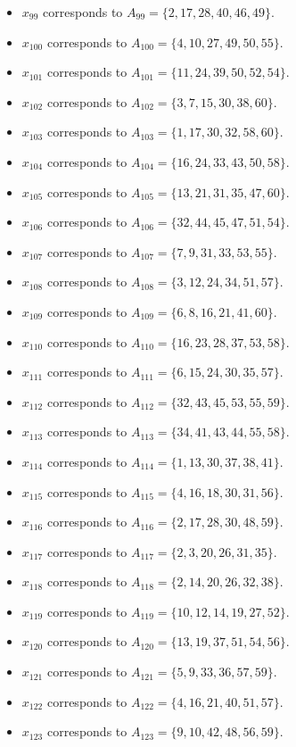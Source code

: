 \documentclass[11pt]{article}
\begin{document}
\begin{itemize}
\item $x_{99}$ corresponds to $A_{99}=\{2, 17, 28, 40, 46, 49\}$.
\item $x_{100}$ corresponds to $A_{100}=\{4, 10, 27, 49, 50, 55\}$.
\item $x_{101}$ corresponds to $A_{101}=\{11, 24, 39, 50, 52, 54\}$.
\item $x_{102}$ corresponds to $A_{102}=\{3, 7, 15, 30, 38, 60\}$.
\item $x_{103}$ corresponds to $A_{103}=\{1, 17, 30, 32, 58, 60\}$.
\item $x_{104}$ corresponds to $A_{104}=\{16, 24, 33, 43, 50, 58\}$.
\item $x_{105}$ corresponds to $A_{105}=\{13, 21, 31, 35, 47, 60\}$.
\item $x_{106}$ corresponds to $A_{106}=\{32, 44, 45, 47, 51, 54\}$.
\item $x_{107}$ corresponds to $A_{107}=\{7, 9, 31, 33, 53, 55\}$.
\item $x_{108}$ corresponds to $A_{108}=\{3, 12, 24, 34, 51, 57\}$.
\item $x_{109}$ corresponds to $A_{109}=\{6, 8, 16, 21, 41, 60\}$.
\item $x_{110}$ corresponds to $A_{110}=\{16, 23, 28, 37, 53, 58\}$.
\item $x_{111}$ corresponds to $A_{111}=\{6, 15, 24, 30, 35, 57\}$.
\item $x_{112}$ corresponds to $A_{112}=\{32, 43, 45, 53, 55, 59\}$.
\item $x_{113}$ corresponds to $A_{113}=\{34, 41, 43, 44, 55, 58\}$.
\item $x_{114}$ corresponds to $A_{114}=\{1, 13, 30, 37, 38, 41\}$.
\item $x_{115}$ corresponds to $A_{115}=\{4, 16, 18, 30, 31, 56\}$.
\item $x_{116}$ corresponds to $A_{116}=\{2, 17, 28, 30, 48, 59\}$.
\item $x_{117}$ corresponds to $A_{117}=\{2, 3, 20, 26, 31, 35\}$.
\item $x_{118}$ corresponds to $A_{118}=\{2, 14, 20, 26, 32, 38\}$.
\item $x_{119}$ corresponds to $A_{119}=\{10, 12, 14, 19, 27, 52\}$.
\item $x_{120}$ corresponds to $A_{120}=\{13, 19, 37, 51, 54, 56\}$.
\item $x_{121}$ corresponds to $A_{121}=\{5, 9, 33, 36, 57, 59\}$.
\item $x_{122}$ corresponds to $A_{122}=\{4, 16, 21, 40, 51, 57\}$.
\item $x_{123}$ corresponds to $A_{123}=\{9, 10, 42, 48, 56, 59\}$.

\end{itemize}
\end{document}
